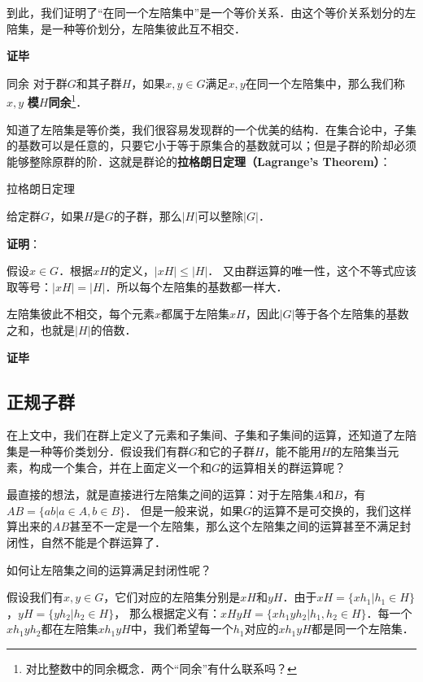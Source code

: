 到此，我们证明了“在同一个左陪集中”是一个等价关系．由这个等价关系划分的左陪集，是一种等价划分，左陪集彼此互不相交．

\textbf{证毕}

\begin{definition}{同余}
对于群$G$和其子群$H$，如果$x, y\in G$满足$x, y$在同一个左陪集中，那么我们称$x, y$ \textbf{模$H$同余}\footnote{对比整数中的同余概念．两个“同余”有什么联系吗？}．
\end{definition}

知道了左陪集是等价类，我们很容易发现群的一个优美的结构．在集合论中，子集的基数可以是任意的，只要它小于等于原集合的基数就可以；但是子群的阶却必须能够整除原群的阶．这就是群论的\textbf{拉格朗日定理（Lagrange's Theorem）}：

\begin{theorem}{拉格朗日定理}\label{Group1_the2}

给定群$G$，如果$H$是$G$的子群，那么$|H|$可以整除$|G|$．

\end{theorem}

\textbf{证明}：

假设$x\in G$．根据$xH$的定义，$|xH|\leq|H|$． 又由群运算的唯一性，这个不等式应该取等号：$|xH|=|H|$．所以每个左陪集的基数都一样大．

左陪集彼此不相交，每个元素$x$都属于左陪集$xH$，因此$|G|$等于各个左陪集的基数之和，也就是$|H|$的倍数．

\textbf{证毕}

\subsection{正规子群}

在上文中，我们在群上定义了元素和子集间、子集和子集间的运算，还知道了左陪集是一种等价类划分．假设我们有群$G$和它的子群$H$，能不能用$H$的左陪集当元素，构成一个集合，并在上面定义一个和$G$的运算相关的群运算呢？

最直接的想法，就是直接进行左陪集之间的运算：对于左陪集$A$和$B$，有$AB=\{ab|a\in A, b\in B\}$． 但是一般来说，如果$G$的运算不是可交换的，我们这样算出来的$AB$甚至不一定是一个左陪集，那么这个左陪集之间的运算甚至不满足封闭性，自然不能是个群运算了．

如何让左陪集之间的运算满足封闭性呢？

假设我们有$x, y\in G$，它们对应的左陪集分别是$xH$和$yH$．由于$xH=\{xh_1|h_1\in H\}$，$yH=\{yh_2|h_2\in H\}$， 那么根据定义有：$xHyH=\{xh_1yh_2|h_1, h_2\in H\}$．每一个$xh_1yh_2$都在左陪集$xh_1yH$中，我们希望每一个$h_1$对应的$xh_1yH$都是同一个左陪集．

